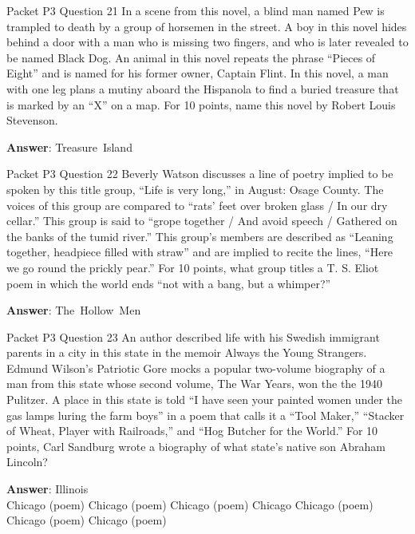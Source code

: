 \begin{frame}{Packet P3 Question 21}
In a scene from this novel, a blind man named   Pew is trampled     to death by a group of horsemen in the street. A boy in this novel hides behind a door with a man who is missing two fingers, and who is later revealed to be named Black Dog. An animal in this novel repeats the phrase ``Pieces of Eight'' and is named for his former owner, Captain Flint. In this novel, a man with one leg plans a mutiny aboard the Hispanola to find a buried treasure that is marked by an ``X'' on a map. For 10 points, name this novel by Robert Louis Stevenson.  

\textbf{Answer}: Treasure\ Island\\
\end{frame}

\begin{frame}{Packet P3 Question 22}
Beverly Watson discusses a line of poetry implied to be spoken by this title group, ``Life is very long,'' in August: Osage County. The voices of this group are compared to ``rats' feet over broken glass /   In our dry cellar.'' This group is said to ``grope together / And avoid speech / Gathered on the banks of the tumid river.'' This group's members are described as ``Leaning together, headpiece filled with straw'' and are implied   to recite the lines,   ``Here we go round the prickly pear.''   For 10 points, what group titles a T. S. Eliot poem in which the world ends ``not with a bang, but a whimper?''

\textbf{Answer}: The\ Hollow\ Men\\
\end{frame}

\begin{frame}{Packet P3 Question 23}
An author described life with his Swedish immigrant parents in a city in this state in the memoir Always the Young Strangers. Edmund Wilson’s Patriotic Gore mocks a popular two-volume biography of a man from this state whose second volume, The War Years, won the the 1940 Pulitzer. A place in this state is told “I have seen your painted women under the gas lamps luring the farm boys” in a poem that calls it a “Tool Maker,” “Stacker of Wheat, Player with Railroads,” and “Hog Butcher for the World.”   For 10 points, Carl Sandburg wrote a biography     of what state’s native son Abraham Lincoln?        

\textbf{Answer}: Illinois\\
 Chicago (poem)
 Chicago (poem)
 Chicago (poem)
 Chicago
 Chicago (poem)
 Chicago (poem)
 Chicago (poem)
\end{frame}

